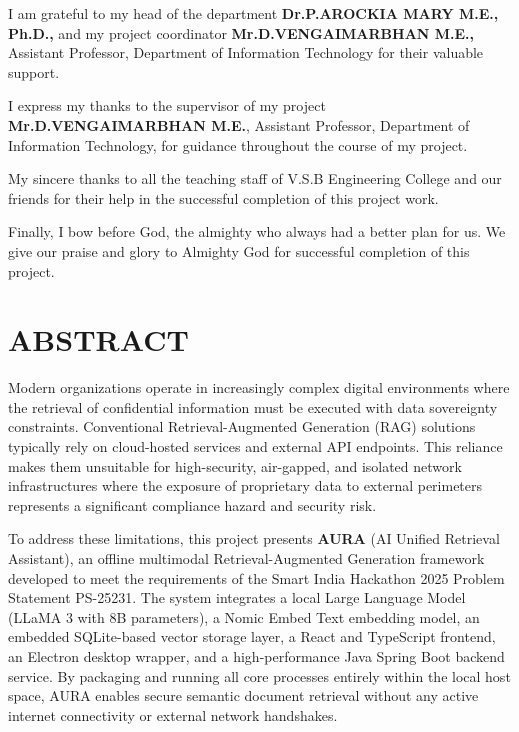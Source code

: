 \documentclass[12pt,a4paper]{report}
\begin{document}
\vspace{0.5cm}
\noindent
I am grateful to my head of the department \textbf{Dr.P.AROCKIA MARY M.E., Ph.D.,} and my project coordinator \textbf{Mr.D.VENGAIMARBHAN M.E.,} Assistant Professor, Department of Information Technology for their valuable support.

\vspace{0.5cm}
\noindent
I express my thanks to the supervisor of my project \textbf{Mr.D.VENGAIMARBHAN M.E.}, Assistant Professor, Department of Information Technology, for guidance throughout the course of my project.

\vspace{0.5cm}
\noindent
My sincere thanks to all the teaching staff of V.S.B Engineering College and our friends for their help in the successful completion of this project work.

\vspace{0.5cm}
\noindent
Finally, I bow before God, the almighty who always had a better plan for us. We give our praise and glory to Almighty God for successful completion of this project.

\clearpage

\chapter*{ABSTRACT}
Modern organizations operate in increasingly complex digital environments where the retrieval of confidential information must be executed with data sovereignty constraints. Conventional Retrieval-Augmented Generation (RAG) solutions typically rely on cloud-hosted services and external API endpoints. This reliance makes them unsuitable for high-security, air-gapped, and isolated network infrastructures where the exposure of proprietary data to external perimeters represents a significant compliance hazard and security risk.

To address these limitations, this project presents \textbf{AURA} (AI Unified Retrieval Assistant), an offline multimodal Retrieval-Augmented Generation framework developed to meet the requirements of the Smart India Hackathon 2025 Problem Statement PS-25231. The system integrates a local Large Language Model (LLaMA 3 with 8B parameters), a Nomic Embed Text embedding model, an embedded SQLite-based vector storage layer, a React and TypeScript frontend, an Electron desktop wrapper, and a high-performance Java Spring Boot backend service. By packaging and running all core processes entirely within the local host space, AURA enables secure semantic document retrieval without any active internet connectivity or external network handshakes.
\end{document}
